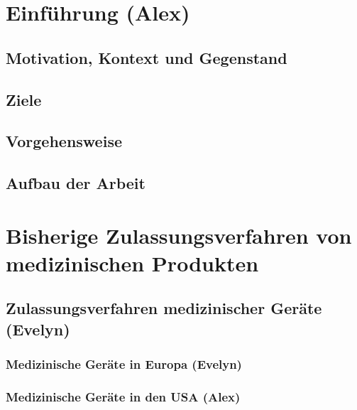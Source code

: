 \documentclass[a4paper, 11pt]{article}
\begin{document}
    \pagestyle{empty}
    
    \newpage
    
        
    \newpage
    \hypertarget{contents}{}
    \tableofcontents

    \newpage
    \pagestyle{fancy}
    \section{Einführung \small{(Alex)}}\label{sec:introduction}
        
		\subsection{Motivation, Kontext und Gegenstand}\label{sec:motivationcontext}
			
		\subsection{Ziele}\label{sec:goals}
			
		\subsection{Vorgehensweise}\label{sec:procedure}
			
		\subsection{Aufbau der Arbeit}\label{sec:structure}
			

	\newpage
	\section{Bisherige Zulassungsverfahren von medizinischen Produkten}\label{sec:admission}
		
		\subsection{Zulassungsverfahren medizinischer Geräte \small{(Evelyn)}}\label{sec:medproducts}
					
			\subsubsection{Medizinische Geräte in Europa \small{(Evelyn)}}\label{sec:europe-no-ai}
				
			\subsubsection{Medizinische Geräte in den USA \small{(Alex)}}\label{sec:us-no-ai}
					
\end{document}
